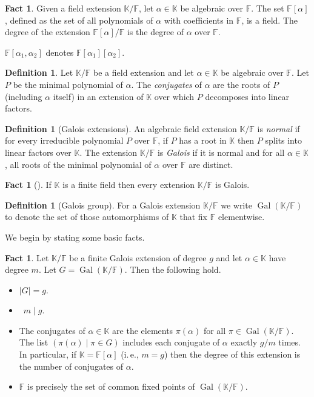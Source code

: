 \documentclass[11pt]{article}
\numberwithin{equation}{section}
\theoremstyle{definition}
\theoremstyle{plain}
\newcommand{\ie}{i.\,e.}
\theoremstyle{definition}
\newtheorem{define}[theorem]{Definition}
\newtheorem{fact.}[theorem]{Fact}
\newcommand\F{{\mathbb{F}}}
\newcommand\K{{\mathbb{K}}}
\DeclareMathOperator{\Gal}{Gal}  %
\begin{document}
\begin{fact.}
Given a field extension $\K/\F$, 
let $\alpha \in \K$ be algebraic over $\F$.
The set $\F[\alpha]$, defined as the set of all polynomials of
$\alpha$ with coefficients in $\F$, is a field.
The degree of the extension $\F[\alpha]/\F$
is the degree of $\alpha$ over $\F$.
\end{fact.}
%
%
$\F[\alpha_1,\alpha_2]$ denotes $\F[\alpha_1][\alpha_2]$. 
\begin{define}
Let $\K/\F$ be a field extension 
and let $\alpha \in \K$ be algebraic over $\F$.
Let $P$ be the minimal polynomial of $\alpha$.  
The \emph{conjugates} of $\alpha$ are the roots of $P$
(including $\alpha$ itself)
%
in an extension of $\K$ over which $P$ decomposes into linear factors. %
\end{define}

\begin{define}[Galois extensions]
  An algebraic field extension $\K/\F$ is \emph{normal} if for
  every irreducible polynomial $P$ over $\F$, if $P$ has a root
  in $\K$ then $P$ splits into linear factors over $\K$.
  The extension $\K/\F$ is \emph{Galois} if it is normal
  and for all $\alpha\in\K$, all roots of the minimal polynomial
  of $\alpha$ over $\F$ are distinct.
\end{define}

\begin{fact.}[{\cite[Ch. V, Thm. 5.5]{lang}}]
If $\K$ is a finite field then every extension $\K/\F$ is Galois.
\end{fact.}
%
%

\begin{define}[Galois group]
For a Galois extension $\K/\F$ we write $\Gal(\K/\F)$
to denote the set of those automorphisms of $\K$ that
fix $\F$ elementwise.
\end{define}
  
We begin by stating some basic facts.  

\begin{fact.}   \label{fact:galois-extension-facts}
Let $\K/\F$ be a finite Galois extension of degree $g$
and let $\alpha\in \K$ have degree $m$.  Let $G=\Gal(\K/\F)$.
Then the following hold.
\begin{itemize}
\item[(i)] $|G|=g$.
\item[(ii)] \ $m\mid g$.
\item[(iii)] The conjugates of $\alpha \in \K$ are the elements
  $\pi(\alpha)$ for all $\pi \in \Gal(\K/\F)$.  The
  list $(\pi(\alpha)\mid \pi\in G)$ includes each
  conjugate of $\alpha$ exactly $g/m$ times.
  In particular, if
  $\K = \F[\alpha]$ (\ie, $m=g$) then the degree of
  this extension is the number of conjugates of $\alpha$.
\item[(iv)] $\F$ is precisely the set of common fixed points of
$\Gal(\K/\F)$.
\end{itemize}
\end{fact.}
\end{document}

